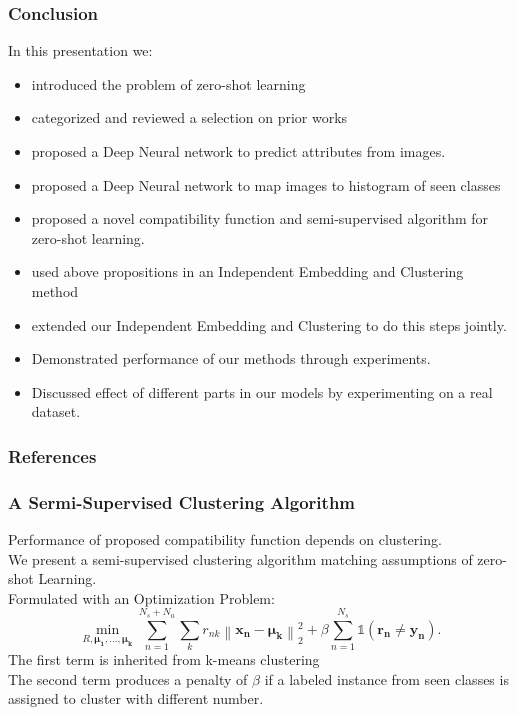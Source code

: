 \documentclass{beamer}
\newcommand{\normtwo}[1]{\left \lVert #1 \right \rVert_2^2}
\begin{document}
\begin{frame}
  \frametitle{Conclusion}
  In this presentation we:
  \begin{itemize}
    \item introduced the problem of zero-shot learning
    \item categorized and reviewed a selection on prior works
    \item proposed a Deep Neural network to predict attributes from images.
    \item proposed a Deep Neural network to map images to histogram of seen classes
    \item proposed a novel compatibility function and semi-supervised algorithm for zero-shot learning.
    \item used above propositions in an Independent Embedding and Clustering method
    \item extended our Independent Embedding and Clustering to do this steps jointly.
    \item Demonstrated performance of our methods through experiments.
    \item Discussed effect of different parts in our models by experimenting on a real dataset.
  \end{itemize}
\end{frame}
\begin{frame}[allowframebreaks]
        \frametitle{References}
        {\footnotesize
        
        
        }
\end{frame}

\begin{frame}[noframenumbering]\frametitle{A Sermi-Supervised Clustering Algorithm}
  Performance of proposed compatibility function depends on clustering.\\
  We present a semi-supervised clustering algorithm matching assumptions of zero-shot Learning. \\
  Formulated with an Optimization Problem:
  \begin{equation} \label{eq:my_clustering}
\min_{R, \boldsymbol{\mu_1, \ldots, \mu_k }} \sum_{n=1}^{N_s + N_u}  \sum_{k} r_{nk} \normtwo{\mathbf{x_n} - \boldsymbol{\mu_k}} +
 \beta \sum_{n=1}^{N_s} \mathds{1}(\mathbf{r_n} \neq \mathbf{y_n}).
\end{equation}
The first term is inherited from k-means clustering \\
\vspace{1mm}
The second term produces a penalty of $\beta$ if a labeled instance from seen classes
is assigned to cluster with different number.
\end{frame}
\end{document}
